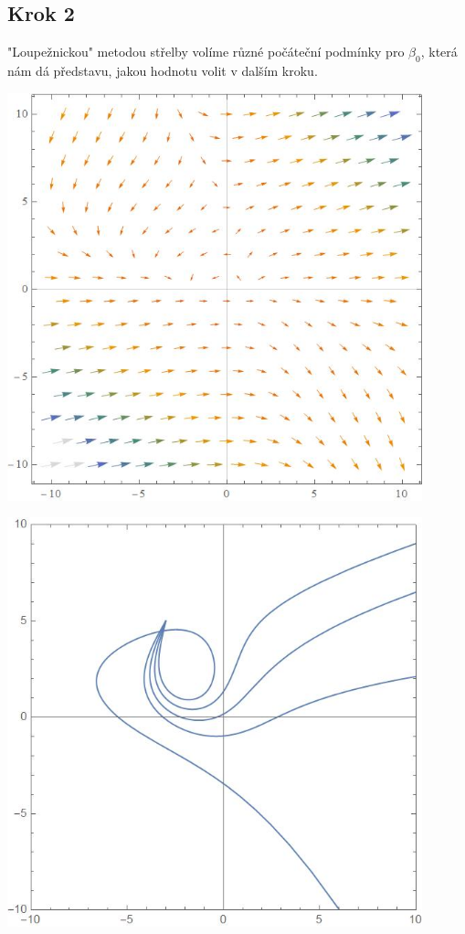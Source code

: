\documentclass[reqno, a4paper]{amsart}
\begin{document}
\subsection*{Krok 2}
"Loupežnickou" metodou střelby volíme různé počáteční podmínky pro $\beta_0$, která nám dá představu, jakou hodnotu volit v dalším kroku.
\begin{verbatim*}
	ParametricPlot[Table[{x[\[Beta]0][t],y[\[Beta]0][t]}/.sol,{\[Beta]0,4.5,5.5,0.3}],{t,0,2},Frame->True
	,PlotRange->{{-10,10},{-10,10}}]
\end{verbatim*}
\begin{minipage}{\textwidth}
	\begin{minipage}[b]{0.5\textwidth}
		\centering
		\includegraphics[width=0.9\textwidth]{obecne1}
	\end{minipage}
	\begin{minipage}[b]{0.5\textwidth}
		\centering
		\includegraphics[width=0.9\textwidth]{obecne2}
	\end{minipage}
	\hfill
\end{minipage}
\end{document}
